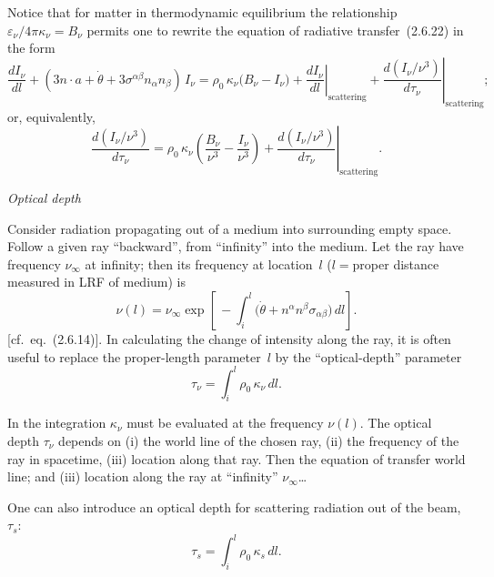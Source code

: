 Notice that for matter in thermodynamic equilibrium the relationship
$\varepsilon_\nu / 4\pi\kappa_\nu = B_\nu$ permits one to rewrite the equation
of radiative transfer~(2.6.22) in the form
%
\begin{equation}
\tag{2.6.26}
\frac{dI_\nu}{dl} + (3n\cdot a + \dot\theta + 3\sigma^{\alpha\beta}
n_\alpha n_\beta)\, I_\nu
= \rho_0\,\kappa_\nu\bigl(B_\nu - I_\nu\bigr)
  + \left.\frac{dI_\nu}{dl}\right|_{\text{scattering}}
  + \left.\frac{d(I_\nu/\nu^3)}{d\tau_\nu}\right|_{\text{scattering}} ;
\end{equation}
%
or, equivalently,
%
\begin{equation}
\tag{2.6.27}
\frac{d(I_\nu/\nu^3)}{d\tau_\nu}
= \rho_0\,\kappa_\nu \left(\frac{B_\nu}{\nu^3}
  - \frac{I_\nu}{\nu^3}\right)
  + \left.\frac{d(I_\nu/\nu^3)}{d\tau_\nu}\right|_{\text{scattering}}.
\end{equation}


\bigskip
\noindent
\emph{Optical depth}

\medskip
\noindent
Consider radiation propagating out of a medium into surrounding empty space.
Follow a given ray ``backward'', from ``infinity'' into the medium.  Let the ray
have frequency $\nu_\infty$ at infinity; then its frequency at location~$l$
($l = {}$proper distance measured in LRF of medium) is
%
\begin{equation}
\tag{2.6.28}
\nu(l) = \nu_\infty \exp\!\left[\,-\int_i^l
\bigl(\dot\theta + n^\alpha n^\beta \sigma_{\alpha\beta}\bigr)\,dl\right].
\end{equation}
%
[cf.\ eq.~(2.6.14)].  In calculating the change of intensity along the ray, it is
often useful to replace the proper-length parameter~$l$ by the
``optical-depth'' parameter
%
\begin{equation}
\tag{2.6.29}
\tau_\nu = \int_i^l \rho_0\,\kappa_\nu\,dl.
\end{equation}

In the integration $\kappa_\nu$ must be evaluated at the frequency
$\nu(l)$.  The optical depth $\tau_\nu$ depends on (i) the world line of
the chosen ray, (ii) the frequency of the ray in spacetime, (iii) location
along that ray.  Then the equation of transfer
world line; and (iii) location along the ray at ``infinity'' $\nu_\infty$\ldots

One can also introduce an optical depth for scattering radiation out of the
beam, $\tau_s$:
%
\begin{equation}
\tag{2.6.30}
\tau_s = \int_i^l \rho_0\,\kappa_s\,dl.
\end{equation}

